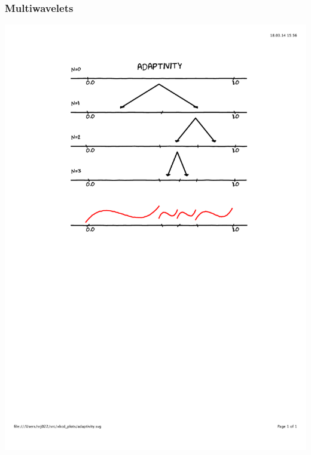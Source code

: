 \begin{frame}
\frametitle{Multiwavelets}
\centering
\includegraphics[scale=0.5, clip, viewport=100 400 500 800]{figures/adaptivity.pdf}
\end{frame}

